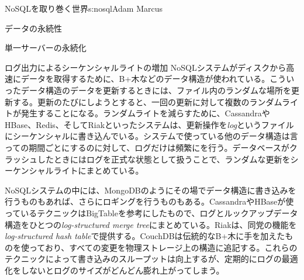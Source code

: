\begin{aosachapter}{NoSQLを取り巻く世界}{s:nosql}{Adam Marcus}
\begin{aosasect1}{データの永続性}
\begin{aosasect2}{単一サーバーの永続化}
\begin{aosasect3}{ログ出力によるシーケンシャルライトの増加}
NoSQLシステムがディスクから高速にデータを取得するために、B+木などのデータ構造が使われている。こういったデータ構造のデータを更新するときには、ファイル内のランダムな場所を更新する。更新のたびにしようとすると、一回の更新に対して複数のランダムライトが発生することになる。ランダムライトを減らすために、CassandraやHBase、Redis、そしてRiakといったシステムは、更新操作を\emph{log}というファイルにシーケンシャルに書き込んでいる。システムで使っている他のデータ構造は言っての期間ごとにするのに対して、ログだけは頻繁にを行う。データベースがクラッシュしたときにはログを正式な状態として扱うことで、ランダムな更新をシーケンシャルライトにまとめている。

NoSQLシステムの中には、MongoDBのようにその場でデータ構造に書き込みを行うものもあれば、さらにロギングを行うものもある。CassandraやHBaseが使っているテクニックはBigTableを参考にしたもので、ログとルックアップデータ構造をひとつの\emph{log-structured merge tree}にまとめている。Riakは、同党の機能を\emph{log-structured hash table}で提供する。CouchDBは伝統的なB+木に手を加えたものを使っており、すべての変更を物理ストレージ上の構造に追記する。これらのテクニックによって書き込みのスループットは向上するが、定期的にログの最適化をしないとログのサイズがどんどん膨れ上がってしまう。


\end{aosasect3}
\end{aosasect2}
\end{aosasect1}
\end{aosachapter}
